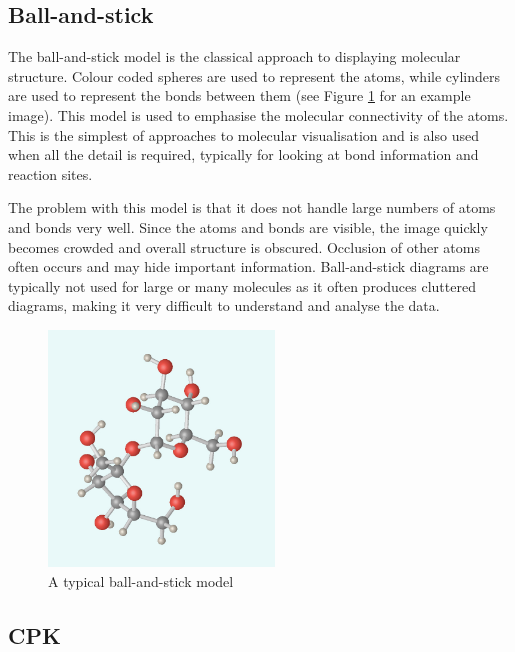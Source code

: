 
\subsection{Ball-and-stick}
\label{sub:background_ballstick}

The ball-and-stick model is the classical approach to displaying molecular
structure. Colour coded spheres are used to represent the atoms, while
cylinders are used to represent the bonds between them (see Figure
\ref{fig:background_ballstick} for an example image). This model is used to
emphasise the molecular connectivity of the atoms. This is the simplest of
approaches to molecular visualisation and is also used when all the detail is
required, typically for looking at bond information and reaction sites.

The problem with this model is that it does not handle large numbers of atoms
and bonds very well. Since the atoms and bonds are visible, the image quickly
becomes crowded and overall structure is obscured. Occlusion of other atoms
often occurs and may hide important information. Ball-and-stick diagrams are
typically not used for large or many molecules as it often produces cluttered
diagrams, making it very difficult to understand and analyse the data.

\begin{figure}[h!]
  \begin{center}
    \includegraphics[width=60mm]{BallStick}
  \end{center}
  \caption{A typical ball-and-stick model}
  \label{fig:background_ballstick}
\end{figure}


\subsection{CPK}
\label{sub:background_cpk}

